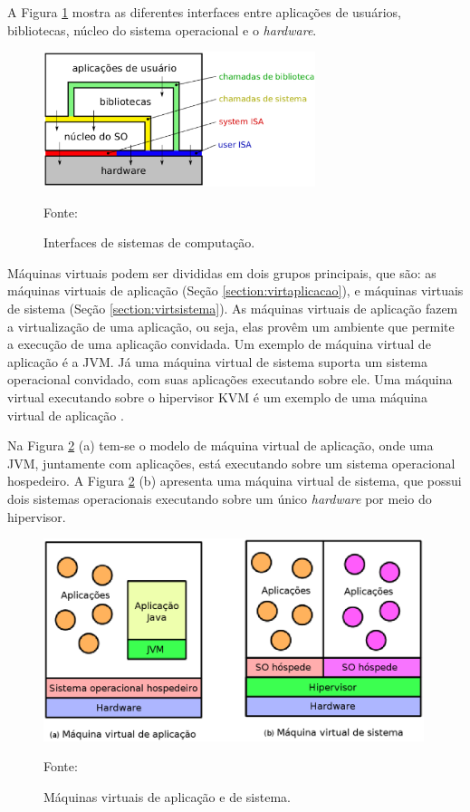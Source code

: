 A Figura \ref{fig:interfaces_isa} mostra as diferentes interfaces entre aplicações de usuários, bibliotecas, núcleo do sistema operacional e o 
\textit{hardware}.

\begin{figure}[h!]
 \centering
 \includegraphics[width=300px]{img/interfaces_isa.eps}
 \caption{Interfaces de sistemas de computação.}
 \label{fig:interfaces_isa}
 Fonte: \citet{maziero2013}
\end{figure}

Máquinas virtuais podem ser divididas em dois grupos principais, que são: as máquinas virtuais de aplicação (Seção \ref{section:virtaplicacao}), 
e máquinas virtuais de sistema (Seção \ref{section:virtsistema}). As máquinas virtuais de aplicação fazem a virtualização de uma aplicação, 
ou seja, elas provêm um ambiente que permite a execução de uma aplicação convidada. Um exemplo de máquina virtual de aplicação é a \ac{JVM}. 
Já uma máquina virtual de sistema suporta um sistema operacional convidado, com suas aplicações executando sobre ele. Uma máquina virtual 
executando sobre o hipervisor \ac{KVM} \cite{kvm} é um exemplo de uma máquina virtual de aplicação \cite{laureano2008}.

Na Figura \ref{fig:vms_tipos} (a) tem-se o modelo de máquina virtual de aplicação, onde uma \ac{JVM}, juntamente com aplicações, está executando 
sobre um sistema operacional hospedeiro. A Figura \ref{fig:vms_tipos} (b) apresenta uma máquina virtual de sistema, que possui dois sistemas 
operacionais executando sobre um único \textit{hardware} por meio do hipervisor.

\begin{figure}[h!]
 \centering
 \includegraphics[width=420px]{img/vms_tipos.eps}
 \caption{Máquinas virtuais de aplicação e de sistema.}
 \label{fig:vms_tipos}
 Fonte: \citet{laureano2008}
\end{figure}

